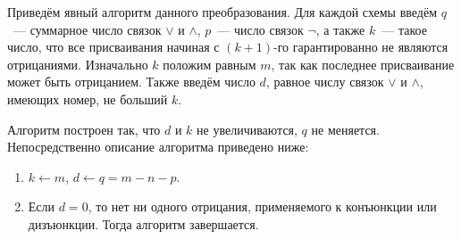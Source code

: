 \begin{Answer}
    \noindent
    Приведём явный алгоритм данного преобразования.
    Для каждой схемы введём $ q $~--- суммарное число связок $ \vee $ и $ \wedge $,
    $ p $~--- число связок $ \neg $,
    а также $ k $~--- такое число,
    что все присваивания начиная с $ (k + 1) $-го гарантированно не являются отрицаниями.
    Изначально $ k $ положим равным $ m $, так как последнее присваивание может быть отрицанием.
    Также введём число $ d $, равное числу связок $ \vee $ и $ \wedge $, имеющих номер, не больший $ k $.

    Алгоритм построен так, что $ d $ и $ k $ не увеличиваются, $ q $ не меняется.
    Непосредственно описание алгоритма приведено ниже:
    \begin{enumerate}
        \item $ k \leftarrow m $, $ d \leftarrow q = m - n - p $.
        \item
            Если $ d = 0 $, то нет ни одного отрицания, применяемого к конъюнкции или дизъюнкции.
            Тогда алгоритм завершается.


\end{enumerate}
\end{Answer}
